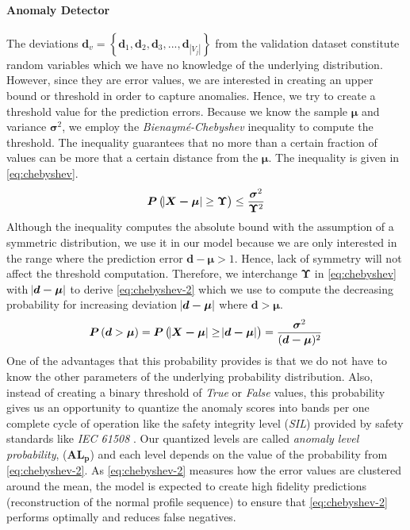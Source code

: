 \paragraph{Anomaly Detector}
\label{subsec:anomaly-detector}
The deviations $ \bm{d}_v = \left\lbrace \bm{d}_1, \bm{d}_2, 
\bm{d}_3,...,\bm{d}_{|V_j|} \right\rbrace  $ from the validation dataset 
constitute random variables which we have no knowledge of the underlying 
distribution. However, since they are error values, we are interested in 
creating an upper bound or threshold in order to capture anomalies. Hence, we 
try to create a threshold value for the prediction errors. Because we know the 
sample $\bm{\mu}$ and variance $\bm{\sigma}^2$,  we employ 
the \emph{Bienaymé-Chebyshev} inequality to compute the threshold. The 
inequality guarantees that no more than a certain fraction of values can be 
more that a certain distance from the $ \bm{\mu} $. The inequality is given in 
\eqref{eq:chebyshev}.
\begin{equation}
\label{eq:chebyshev}
\bm{P}\left(\abs{\bm{X-\mu}} \geq \bm{\Upsilon} \right) \leq 
\frac{\bm{\sigma}^2}{\bm{\Upsilon}^2}
\end{equation}
Although the inequality computes the absolute bound with the assumption of a 
symmetric distribution, we use it in our model because we are only 
interested in the range where the prediction error $ \bm{d} - \bm{\mu} > 1 $. 
Hence, lack of symmetry will not affect the threshold computation. Therefore, 
we interchange $ \bm{\Upsilon} $ in \eqref{eq:chebyshev} with $ 
\abs{\bm{d-\mu}}$ to derive \eqref{eq:chebyshev-2} which we use to compute the 
decreasing probability for increasing deviation $ \abs{\bm{d-\mu}} $ where $ 
\bm{d > \mu} $.
\begin{equation}
\label{eq:chebyshev-2}
\bm{P}\left(\bm{d} > \bm{\mu}\right) = \bm{P}\left(\abs{\bm{X-\mu}} \geq 
\abs{\bm{d-\mu}} \right) = 
\frac{\bm{\sigma}^2}{(\bm{d-\mu})^2}
\end{equation}
One of the advantages that this probability provides is that we do not have to 
know the other parameters of the underlying probability distribution. Also, 
instead of creating a binary threshold of \emph{True} or \emph{False} values, 
this probability gives us an opportunity to quantize the anomaly scores into 
bands per one complete cycle of operation like the safety integrity level 
(\textit{SIL}) provided by safety 
standards like 
\textit{IEC 61508} \cite{bell2006introduction}. Our quantized levels are called 
\emph{anomaly level probability}, ($\bm{AL_p}$) and each level depends on the 
value of the probability from \eqref{eq:chebyshev-2}. As \eqref{eq:chebyshev-2} 
measures how the error values are clustered around the mean, the model is 
expected to create high fidelity predictions (reconstruction of the normal 
profile sequence) to ensure that \eqref{eq:chebyshev-2} performs optimally and 
reduces false negatives.

